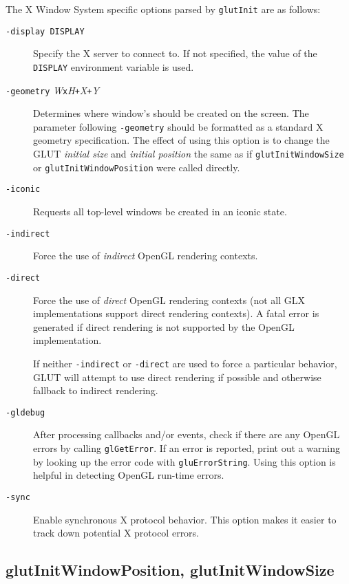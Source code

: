 The X Window System specific options parsed by {\tt glutInit} are as follows:
\begin{description}
\item[\tt -display DISPLAY]
Specify the X server to connect to.  If not specified, the
value of the {\tt DISPLAY} environment variable is used.

\item[{\tt -geometry} {\em W}{\tt x}{\em H}{\tt +}{\em X}{\tt +}{\em Y}]
Determines where window's should be created on the screen.  The
parameter following {\tt -geometry} should be formatted as a standard X geometry specification.
The effect of using this option is to change the GLUT
{\em initial size} and {\em initial position} the same as if
{\tt glutInitWindowSize} or {\tt glutInitWindowPosition}
were called directly.

\item[\tt -iconic]
Requests all top-level windows be created in an iconic state.

\item[\tt -indirect]
Force the use of {\em indirect} OpenGL rendering contexts.

\item[\tt -direct]
Force the use of {\em direct}
OpenGL rendering contexts (not all GLX implementations support
direct rendering contexts).  A fatal error is generated if direct
rendering is not supported by the OpenGL implementation.

If neither {\tt -indirect} or {\tt -direct} are used to force
a particular behavior, GLUT will attempt to use direct rendering
if possible and otherwise fallback to indirect rendering.

\item[\tt -gldebug]
After processing callbacks and/or events, check if there are any OpenGL
errors by calling {\tt glGetError}.  If an error is reported, print out
a warning by looking up the error code with {\tt gluErrorString}.  Using
this option is helpful in detecting OpenGL run-time errors.

\item[\tt -sync]
Enable synchronous X protocol behavior.  This option makes it easier
to track down potential X protocol errors.

\end{description}

\subsection{glutInitWindowPosition, glutInitWindowSize}

